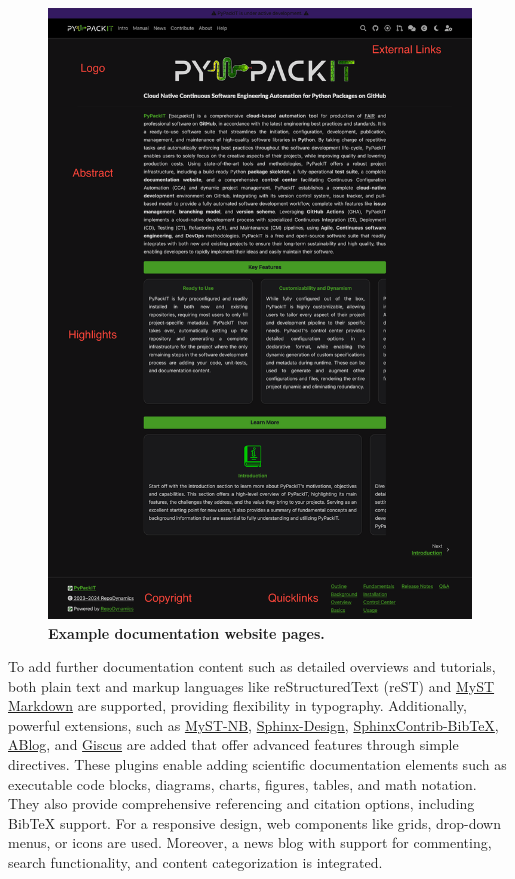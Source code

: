 \documentclass{article}
\begin{document}
\begin{figure}[h!]
    \centering
    \includegraphics[width=1\linewidth]{Fig_docs.png}
    \caption{\textbf{Example documentation website pages.}}
    \label{fig:templating}
\end{figure}


To add further documentation content such as detailed overviews and tutorials, both plain text and markup languages like reStructuredText (reST) and \href{https://mystmd.org/}{MyST Markdown} are supported, providing flexibility in typography. Additionally, powerful extensions, such as \href{https://myst-nb.readthedocs.io/en/latest/}{MyST-NB}, \href{https://sphinx-design.readthedocs.io/}{Sphinx-Design}, \href{https://sphinxcontrib-bibtex.readthedocs.io/}{SphinxContrib-BibTeX}, \href{https://ablog.readthedocs.io/}{ABlog}, and \href{https://giscus.app/}{Giscus} are added that offer advanced features through simple directives. These plugins enable adding scientific documentation elements such as executable code blocks, diagrams, charts, figures, tables, and math notation. They also provide comprehensive referencing and citation options, including BibTeX support. For a responsive design, web components like grids, drop-down menus, or icons are used. Moreover, a news blog with support for commenting, search functionality, and content categorization is integrated.
\end{document}
